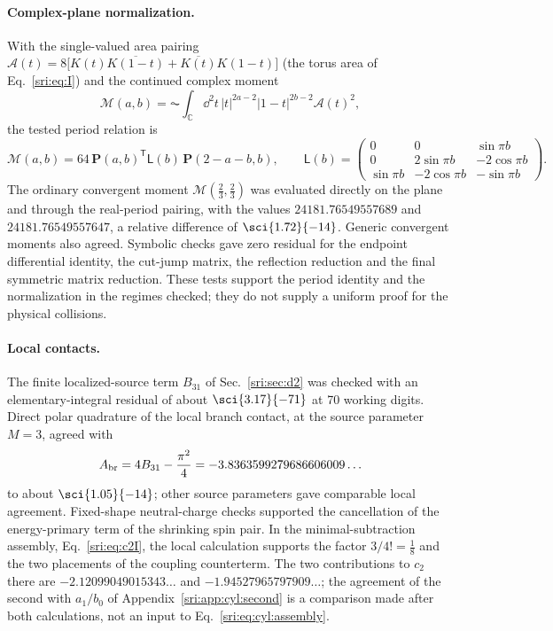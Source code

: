 \paragraph{Complex-plane normalization.} With the single-valued area pairing
$\mathcal A(t)=8\bigl[K(t)\overline{K(1-t)}+\overline{K(t)}K(1-t)\bigr]$ (the torus area of Eq.~\eqref{sri:eq:I}) and the
continued complex moment
\begin{equation}
 \mathcal M(a,b)=\AC\!\int_{\mathbb C}\dd^2t\,|t|^{2a-2}|1-t|^{2b-2}\mathcal A(t)^2,
\end{equation}
the tested period relation is
\begin{equation}
 \mathcal M(a,b)=64\,\mathbf P(a,b)^{\mathsf T}\mathsf L(b)\,\mathbf P(2-a-b,b),\qquad
 \mathsf L(b)=\begin{pmatrix}0&0&\sin\pi b\\0&2\sin\pi b&-2\cos\pi b\\ \sin\pi b&-2\cos\pi b&-\sin\pi b\end{pmatrix}.
\end{equation}
The ordinary convergent moment $\mathcal M(\frac23,\frac23)$ was evaluated directly on the plane and through the
real-period pairing, with the values $24181.76549557689$ and $24181.76549557647$, a relative difference of
$\sci{1.72}{-14}$. Generic convergent moments also agreed. Symbolic checks gave zero residual for the endpoint
differential identity, the cut-jump matrix, the reflection reduction and the final symmetric matrix reduction. These
tests support the period identity and the normalization in the regimes checked; they do not supply a uniform proof for
the physical collisions.

\paragraph{Local contacts.} The finite localized-source term $B_{31}$ of Sec.~\ref{sri:sec:d2} was checked with an
elementary-integral residual of about $\sci{3.17}{-71}$ at 70 working digits. Direct polar quadrature of the local
branch contact, at the source parameter $M=3$, agreed with
\begin{equation}
 A_{\rm br}=4B_{31}-\frac{\pi^2}4=-3.8363599279686606009\ldots
\end{equation}
to about $\sci{1.05}{-14}$; other source parameters gave comparable local agreement. Fixed-shape neutral-charge checks
supported the cancellation of the energy-primary term of the shrinking spin pair. In the minimal-subtraction assembly,
Eq.~\eqref{sri:eq:c2I}, the local calculation supports the factor $3/4!=\frac18$ and the two placements of the coupling
counterterm. The two contributions to $c_2$ there are $-2.12099049015343\ldots$ and $-1.94527965797909\ldots$; the
agreement of the second with $a_1/b_0$ of Appendix~\ref{sri:app:cyl:second} is a comparison made after both calculations, not
an input to Eq.~\eqref{sri:eq:cyl:assembly}.

